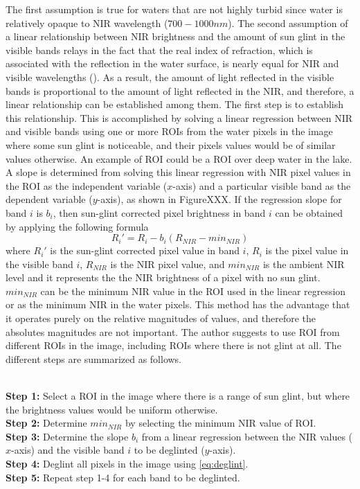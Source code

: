 The first assumption is true for waters that are not highly turbid since water is relatively opaque to NIR wavelength ($700-1000nm$). The second assumption of a linear relationship between NIR brightness and the amount of sun glint in the visible bands relays in the fact that the real index of refraction, which is associated with the reflection in the water surface, is nearly equal for NIR and visible wavelengths (\cite{Mobley1994}). As a result, the amount of light reflected in the visible bands is proportional to the amount of light reflected in the NIR, and therefore, a linear relationship can be established among them. The first step is to establish this relationship. This is accomplished by solving a linear regression between NIR and visible bands using one or more ROIs from the water pixels in the image where some sun glint is noticeable, and their pixels values would be of similar values otherwise. An example of ROI could be a ROI over deep water in the lake. A slope is determined from solving this linear regression with NIR pixel values in the ROI as the independent variable ($x$-axis) and a particular visible band as the dependent variable ($y$-axis), as shown in  FigureXXX. If the regression slope for band $i$ is $b_i$, then sun-glint corrected pixel brightness in band $i$ can be obtained by applying the following formula
\begin{equation}\label{eq:deglint}
  R_i' = R_i - b_i(R_{NIR}-min_{NIR})
\end{equation}
where $R_i'$ is the sun-glint corrected pixel value in band $i$, $R_i$ is the pixel value in the visible band $i$, $R_{NIR}$ is the NIR pixel value, and $min_{NIR}$ is the ambient NIR level and it represents the the NIR brightness of a pixel with no sun glint. $min_{NIR}$ can be the minimum NIR value in the ROI used in the linear regression or as the minimum NIR in the water pixels. This method has the advantage that it operates purely on the relative magnitudes of values, and therefore the absolutes magnitudes are not important. The author suggests to use ROI from different ROIs in the image, including ROIs where there is not glint at all. The different steps are summarized as follows.

\\
{\bf Step 1:} Select a ROI in the image where there is a range of sun glint, but where the brightness values would be uniform otherwise.\\
{\bf Step 2:} Determine $min_{NIR}$ by selecting the minimum NIR value of ROI.\\
{\bf Step 3:} Determine the slope $b_i$ from a linear regression between the NIR values ($x$-axis) and the visible band $i$ to be deglinted ($y$-axis).\\
{\bf Step 4:} Deglint all pixels in the image using \autoref{eq:deglint}.\\
{\bf Step 5:} Repeat step 1-4 for each band to be deglinted.

